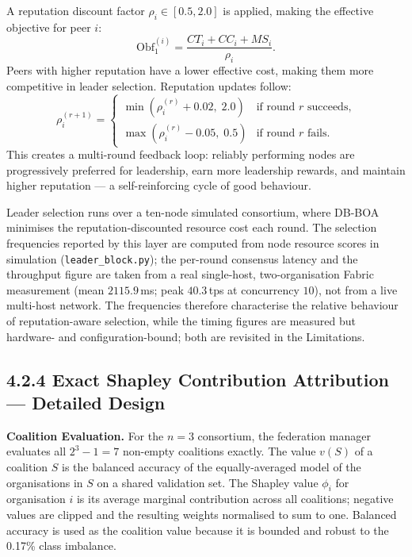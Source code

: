 A reputation discount factor $\rho_i \in [0.5, 2.0]$ is applied, making the effective objective for peer $i$:
\begin{equation}\label{eq:obf1_rep}
    \mathrm{Obf}_1^{(i)} = \frac{CT_i + CC_i + MS_i}{\rho_i}.
\end{equation}
Peers with higher reputation have a lower effective cost, making them more competitive in leader selection. Reputation updates follow:
\begin{equation}\label{eq:rep_update}
    \rho_i^{(r+1)} = \begin{cases}
        \min\!\left(\rho_i^{(r)} + 0.02,\; 2.0\right) & \text{if round } r \text{ succeeds,} \\
        \max\!\left(\rho_i^{(r)} - 0.05,\; 0.5\right) & \text{if round } r \text{ fails.}
    \end{cases}
\end{equation}
This creates a multi-round feedback loop: reliably performing nodes are progressively preferred for leadership, earn more leadership rewards, and maintain higher reputation — a self-reinforcing cycle of good behaviour.

Leader selection runs over a ten-node simulated consortium, where DB-BOA minimises the reputation-discounted resource cost each round. The selection frequencies reported by this layer are computed from node resource scores in simulation (\texttt{leader\_block.py}); the per-round consensus latency and the throughput figure are taken from a real single-host, two-organisation Fabric measurement (mean $2115.9$\,ms; peak $40.3$\,tps at concurrency $10$), not from a live multi-host network. The frequencies therefore characterise the relative behaviour of reputation-aware selection, while the timing figures are measured but hardware- and configuration-bound; both are revisited in the Limitations.

\subsection*{4.2.4 Exact Shapley Contribution Attribution — Detailed Design}

\textbf{Coalition Evaluation.}
For the $n=3$ consortium, the federation manager evaluates all $2^3-1 = 7$ non-empty coalitions exactly. The value $v(S)$ of a coalition $S$ is the balanced accuracy of the equally-averaged model of the organisations in $S$ on a shared validation set. The Shapley value $\phi_i$ for organisation $i$ is its average marginal contribution across all coalitions; negative values are clipped and the resulting weights normalised to sum to one. Balanced accuracy is used as the coalition value because it is bounded and robust to the 0.17\% class imbalance.

